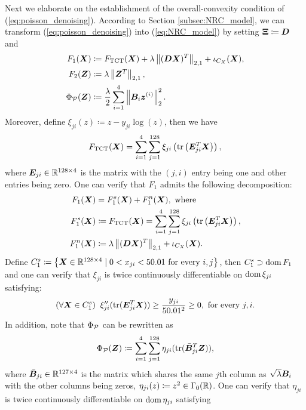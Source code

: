 \documentclass[lettersize,journal]{IEEEtran}
\theoremstyle{plain}%
\theoremstyle{definition}
\theoremstyle{remark}
\begin{document}
Next we elaborate on the establishment of the overall-convexity condition of (\ref{eq:poisson_denoising}). According to Section \ref{subsec:NRC_model}, we can transform (\ref{eq:poisson_denoising}) into (\ref{eq:NRC_model}) by setting $\bm{\Xi}\coloneqq \bm{D}$ and
\begin{align*}
F_1(\bm{X}) &\coloneqq F_{\textrm{TCT}}(\bm{X})+\lambda\left\| (\bm{D}\bm{X})^T \right\|_{2,1}+\iota_{C_X}(\bm{X}),\\
F_2(\bm{Z}) &\coloneqq \lambda\left\| \bm{Z}^T \right\|_{2,1},\\
\Phi_{\mathcal{P}}(\bm{Z}) &\coloneqq \frac{\lambda}{2}\sum_{i=1}^4 \left\| \bm{B}_i\bm{z}^{(i)} \right\|^2_2.
\end{align*}
Moreover, define $\xi_{ji}(z)\coloneqq z-y_{ji}\log(z)$, then we have
\begin{equation*}
F_{\textrm{TCT}}(\bm{X})=\sum_{i=1}^4 \sum_{j=1}^{128} \xi_{ji}\left(\textrm{tr}\left( \bm{E}_{ji}^T\bm{X} \right )\right),
\end{equation*}
where $\bm{E}_{ji}\in\mathbb{R}^{128\times 4}$ is the matrix with the $(j,i)$ entry being one and other entries being zero. One can verify that $F_1$ admits the following decomposition:
\begin{align*}
F_1(\bm{X}) &=F_1^s(\bm{X})+F_1^n(\bm{X}),\textrm{ where }\\
F_1^s(\bm{X}) &\coloneqq F_{\textrm{TCT}}(\bm{X})=\sum_{i=1}^4 \sum_{j=1}^{128} \xi_{ji}\left(\textrm{tr}\left( \bm{E}_{ji}^T\bm{X} \right )\right),\\
F_1^n(\bm{X}) &\coloneqq \lambda\left\| (\bm{D}\bm{X})^T \right\|_{2,1}+\iota_{C_X}(\bm{X}).
\end{align*}
Define $C_1^s\coloneqq\left\{ \bm{X}\in\mathbb{R}^{128\times 4}\mid 0< x_{ji}< 50.01 \textrm{ for every }i,j \right\}$, then $C_1^s\supset \textrm{dom\,}{F_1}$ and one can verify that $\xi_{ji}$ is twice continuously differentiable on $\textrm{dom\,}{\xi_{ji}}$ satisfying:
\begin{equation*}
(\forall \bm{X}\in C_1^s)\;\; \xi_{ji}''(\textrm{tr}(\bm{E}_{ji}^T\bm{X}))\geq \frac{y_{ji}}{50.01^2}\geq 0, \textrm{ for every }j,i.
\end{equation*}
In addition, note that $\Phi_{\mathcal{P}}$ can be rewritten as
\begin{equation*}
\Phi_{\mathcal{P}}(\bm{Z})\coloneqq \sum_{i=1}^4\sum_{j=1}^{128} \eta_{ji}(\textrm{tr}(\bar{\bm{B}}_{ji}^T\bm{Z})),
\end{equation*}
where $\bar{\bm{B}}_{ji}\in\mathbb{R}^{127\times 4}$ is the matrix which shares the same $j$th column as $\sqrt{\lambda}\bm{B}_i$ with the other columns being zeros, $\eta_{ji}(z)\coloneqq z^2\in\Gamma_0(\mathbb{R})$. One can verify that $\eta_{ji}$ is twice continuously differentiable on $\textrm{dom\,}{\eta_{ji}}$ satisfying
\end{document}
